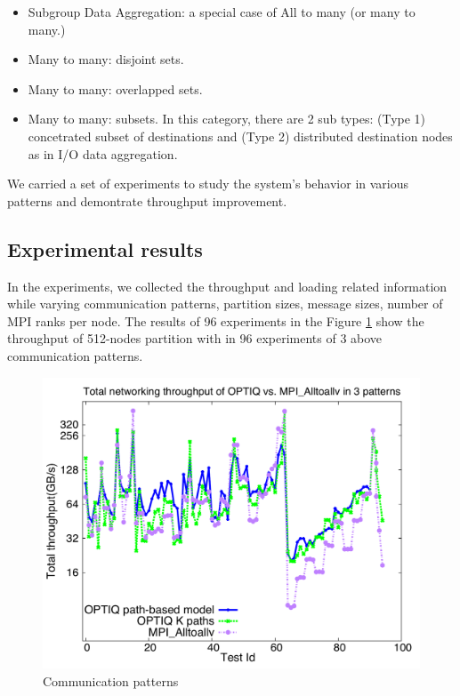 \begin{itemize}
\item Subgroup Data Aggregation: a special case of All to many (or many to many.)
\item Many to many: disjoint sets.
\item Many to many: overlapped sets.
\item Many to many: subsets. In this category, there are 2 sub types: (Type 1) concetrated subset of destinations and (Type 2) distributed destination nodes as in I/O data aggregation.
\end{itemize}

We carried a set of experiments to study the system's behavior in various patterns and demontrate throughput improvement.

\subsection{Experimental results}

In the experiments, we collected the throughput and loading related information while varying communication patterns, partition sizes, message sizes, number of MPI ranks per node.
The results of 96 experiments in the Figure \ref{fig:96tests_512} show the throughput of 512-nodes partition with in 96 experiments of 3 above communication patterns.

\begin{figure}[!htb]
\vspace{-0.1in}
\centering
\includegraphics[scale=0.30]{figures/96tests_512.pdf}
\vspace{-0.1in}
\caption{Communication patterns}
\vspace{-0.1in}
\label{fig:96tests_512}
\end{figure}

